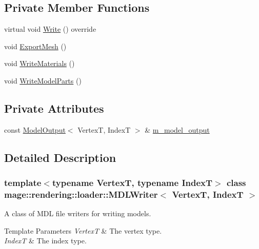 \subsection*{Private Member Functions}
\begin{DoxyCompactItemize}
\item 
virtual void \hyperlink{classmage_1_1rendering_1_1loader_1_1_m_d_l_writer_a1506b1a09c7a7c1ee1e206cc6d5cd0e0}{Write} () override
\item 
void \hyperlink{classmage_1_1rendering_1_1loader_1_1_m_d_l_writer_a77189702168fc4ea6b9482a9efec788f}{Export\+Mesh} ()
\item 
void \hyperlink{classmage_1_1rendering_1_1loader_1_1_m_d_l_writer_afcd1eca27b5854b0f0406dbcae135499}{Write\+Materials} ()
\item 
void \hyperlink{classmage_1_1rendering_1_1loader_1_1_m_d_l_writer_a8fcd997a51d7a46149596d332ebdb8e1}{Write\+Model\+Parts} ()
\end{DoxyCompactItemize}
\subsection*{Private Attributes}
\begin{DoxyCompactItemize}
\item 
const \hyperlink{structmage_1_1rendering_1_1_model_output}{Model\+Output}$<$ VertexT, IndexT $>$ \& \hyperlink{classmage_1_1rendering_1_1loader_1_1_m_d_l_writer_aefa6dfd7c4d7e2abe92e9c93b1e8638c}{m\+\_\+model\+\_\+output}
\end{DoxyCompactItemize}


\subsection{Detailed Description}
\subsubsection*{template$<$typename VertexT, typename IndexT$>$\newline
class mage\+::rendering\+::loader\+::\+M\+D\+L\+Writer$<$ Vertex\+T, Index\+T $>$}

A class of M\+DL file writers for writing models.


\begin{DoxyTemplParams}{Template Parameters}
{\em VertexT} & The vertex type. \\
\hline
{\em IndexT} & The index type. \\
\hline
\end{DoxyTemplParams}


